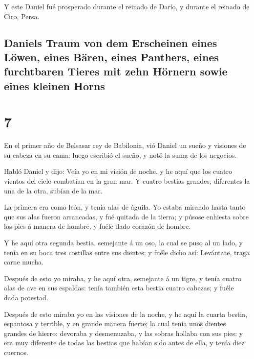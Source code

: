  Y este Daniel fué prosperado durante el reinado de Darío,
y durante el reinado de Ciro, Persa.

\hypertarget{daniels-traum-von-dem-erscheinen-eines-luxf6wen-eines-buxe4ren-eines-panthers-eines-furchtbaren-tieres-mit-zehn-huxf6rnern-sowie-eines-kleinen-horns}{%
\subsection{Daniels Traum von dem Erscheinen eines Löwen, eines Bären,
eines Panthers, eines furchtbaren Tieres mit zehn Hörnern sowie eines
kleinen
Horns}\label{daniels-traum-von-dem-erscheinen-eines-luxf6wen-eines-buxe4ren-eines-panthers-eines-furchtbaren-tieres-mit-zehn-huxf6rnern-sowie-eines-kleinen-horns}}

\hypertarget{section-6}{%
\section{7}\label{section-6}}

 En el primer año de Belsasar rey de Babilonia, vió Daniel
un sueño y visiones de su cabeza en su cama: luego escribió el sueño, y
notó la suma de los negocios.

 Habló Daniel y dijo: Veía yo en mi visión de noche, y he
aquí que los cuatro vientos del cielo combatían en la gran mar.
 Y cuatro bestias grandes, diferentes la una de la otra,
subían de la mar.

 La primera era como león, y tenía alas de águila. Yo estaba
mirando hasta tanto que sus alas fueron arrancadas, y fué quitada de la
tierra; y púsose enhiesta sobre los pies á manera de hombre, y fuéle
dado corazón de hombre.

 Y he aquí otra segunda bestia, semejante á un oso, la cual
se puso al un lado, y tenía en su boca tres costillas entre sus dientes;
y fuéle dicho así: Levántate, traga carne mucha.

 Después de esto yo miraba, y he aquí otra, semejante á un
tigre, y tenía cuatro alas de ave en sus espaldas: tenía también esta
bestia cuatro cabezas; y fuéle dada potestad.

 Después de esto miraba yo en las visiones de la noche, y he
aquí la cuarta bestia, espantosa y terrible, y en grande manera fuerte;
la cual tenía unos dientes grandes de hierro: devoraba y desmenuzaba, y
las sobras hollaba con sus pies: y era muy diferente de todas las
bestias que habían sido antes de ella, y tenía diez cuernos.

